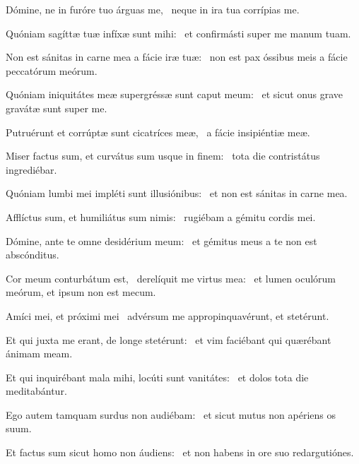 \item Dómine, ne in furóre tuo árguas me,~\psstar{} neque in ira tua corrípias me.

\item Quóniam sagíttæ tuæ infíxæ sunt mihi:~\psstar{} et confirmásti super me manum tuam.

\item Non est sánitas in carne mea a fácie iræ tuæ:~\psstar{} non est pax óssibus meis a fácie peccatórum meórum.

\item Quóniam iniquitátes meæ supergréssæ sunt caput meum:~\psstar{} et sicut onus grave gravátæ sunt super me.

\item Putruérunt et corrúptæ sunt cicatríces meæ,~\psstar{} a fácie insipiéntiæ meæ.

\item Miser factus sum, et curvátus sum usque in finem:~\psstar{} tota die contristátus ingrediébar.

\item Quóniam lumbi mei impléti sunt illusiónibus:~\psstar{} et non est sánitas in carne mea.

\item Afflíctus sum, et humiliátus sum nimis:~\psstar{} rugiébam a gémitu cordis mei.

\item Dómine, ante te omne desidérium meum:~\psstar{} et gémitus meus a te non est abscónditus.

\item Cor meum conturbátum est,~\pscross{} derelíquit me virtus mea:~\psstar{} et lumen oculórum meórum, et ipsum non est mecum.

\item Amíci mei, et próximi mei~\psstar{} advérsum me appropinquavérunt, et stetérunt.

\item Et qui juxta me erant, de longe stetérunt:~\psstar{} et vim faciébant qui quærébant ánimam meam.

\item Et qui inquirébant mala mihi, locúti sunt vanitátes:~\psstar{} et dolos tota die meditabántur.

\item Ego autem tamquam surdus non audiébam:~\psstar{} et sicut mutus non apériens os suum.

\item Et factus sum sicut homo non áudiens:~\psstar{} et non habens in ore suo redargutiónes.

